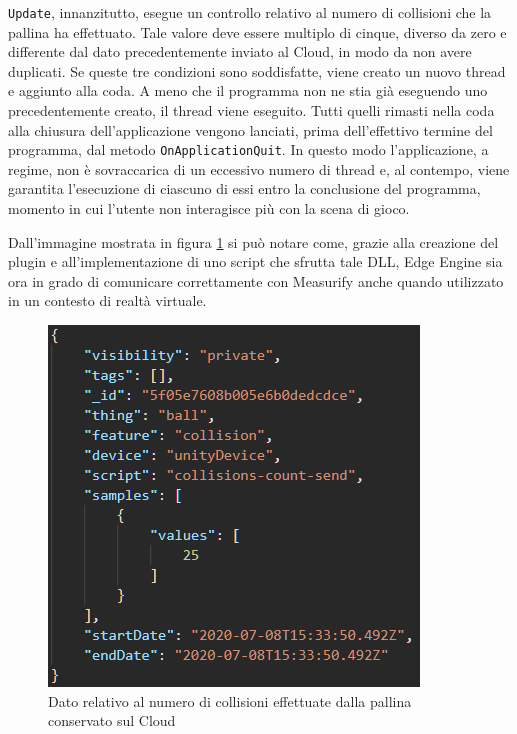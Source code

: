 \texttt{Update}, innanzitutto, esegue un controllo relativo al numero di collisioni che la pallina ha effettuato. Tale valore deve essere multiplo di cinque, diverso da zero e differente dal dato precedentemente inviato al Cloud, in modo da non avere duplicati. Se queste tre condizioni sono soddisfatte, viene creato un nuovo thread e aggiunto alla coda. A meno che il programma non ne stia già eseguendo uno precedentemente creato, il thread viene eseguito. Tutti quelli rimasti nella coda alla chiusura dell'applicazione vengono lanciati, prima dell'effettivo termine del programma, dal metodo \texttt{OnApplicationQuit}. In questo modo l'applicazione, a regime, non è sovraccarica di un eccessivo numero di thread e, al contempo, viene garantita l'esecuzione di ciascuno di essi entro la conclusione del programma, momento in cui l'utente non interagisce più con la scena di gioco.

Dall'immagine mostrata in figura \ref{risorsaunity} si può notare come, grazie alla creazione del plugin e all'implementazione di uno script che sfrutta tale DLL, Edge Engine sia ora in grado di comunicare correttamente con Measurify anche quando utilizzato in un contesto di realtà virtuale.

\begin{figure}[H]
	\centering
	\includegraphics[scale=0.7]{pics/measunity}
	\caption{Dato relativo al numero di collisioni effettuate dalla pallina conservato sul Cloud}
	\label{risorsaunity}
\end{figure}

